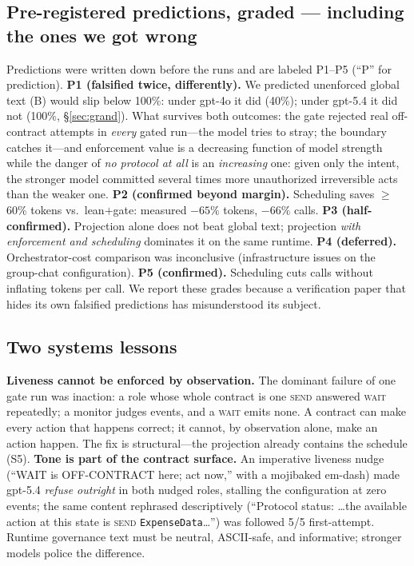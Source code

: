 \documentclass{article}
\begin{document}
\subsection{Pre-registered predictions, graded --- including the ones we got wrong}\label{sec:honest}
Predictions were written down before the runs and are labeled P1--P5 (``P'' for prediction). \textbf{P1 (falsified twice, differently).} We predicted unenforced global text (B) would slip below 100\%: under gpt-4o it did (40\%); under gpt-5.4 it did not (100\%, \S\ref{sec:grand}). What survives both outcomes: the gate rejected real off-contract attempts in \emph{every} gated run---the model tries to stray; the boundary catches it---and enforcement value is a decreasing function of model strength while the danger of \emph{no protocol at all} is an \emph{increasing} one: given only the intent, the stronger model committed several times more unauthorized irreversible acts than the weaker one. \textbf{P2 (confirmed beyond margin).} Scheduling saves $\geq$60\% tokens vs.\ lean$+$gate: measured $-65\%$ tokens, $-66\%$ calls. \textbf{P3 (half-confirmed).} Projection alone does not beat global text; projection \emph{with enforcement and scheduling} dominates it on the same runtime. \textbf{P4 (deferred).} Orchestrator-cost comparison was inconclusive (infrastructure issues on the group-chat configuration). \textbf{P5 (confirmed).} Scheduling cuts calls without inflating tokens per call. We report these grades because a verification paper that hides its own falsified predictions has misunderstood its subject.

\subsection{Two systems lessons}\label{sec:lessons}
\textbf{Liveness cannot be enforced by observation.} The dominant failure of one gate run was inaction: a role whose whole contract is one \textsc{send} answered \textsc{wait} repeatedly; a monitor judges events, and a \textsc{wait} emits none. A contract can make every action that happens correct; it cannot, by observation alone, make an action happen. The fix is structural---the projection already contains the schedule (S5). \textbf{Tone is part of the contract surface.} An imperative liveness nudge (``WAIT is OFF-CONTRACT here; act now,'' with a mojibaked em-dash) made gpt-5.4 \emph{refuse outright} in both nudged roles, stalling the configuration at zero events; the same content rephrased descriptively (``Protocol status: \ldots the available action at this state is \textsc{send} \texttt{ExpenseData}\ldots'') was followed 5/5 first-attempt. Runtime governance text must be neutral, ASCII-safe, and informative; stronger models police the difference.
\end{document}
